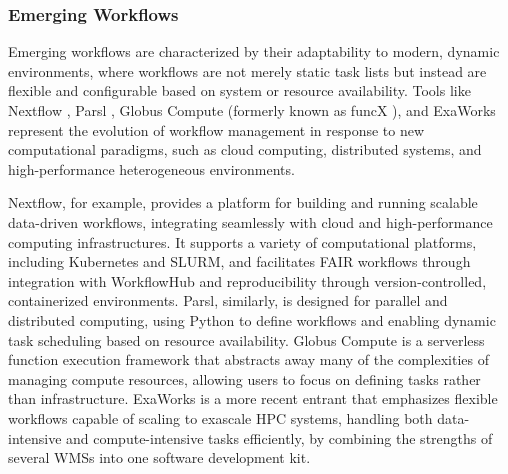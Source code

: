 
\subsubsection{Emerging Workflows}

Emerging workflows are characterized by their adaptability to modern, dynamic environments, where workflows are not merely static task lists but instead are flexible and configurable based on system or resource availability. Tools like Nextflow \citep{di_tommaso_nextflow_2017}, Parsl 
 \citep{babuji2019}, Globus Compute (formerly known as funcX \citep{chard2020}), and ExaWorks \citep{alsaadi2024} represent the evolution of workflow management in response to new computational paradigms, such as cloud computing, distributed systems, and high-performance heterogeneous environments.

Nextflow, for example, provides a platform for building and running scalable data-driven workflows, integrating seamlessly with cloud and high-performance computing infrastructures. It supports a variety of computational platforms, including Kubernetes and SLURM, and facilitates FAIR workflows \citep{wilkinson2025, wilkinson2022} through integration with WorkflowHub \citep{gustafsson2024} and reproducibility through version-controlled, containerized environments. Parsl, similarly, is designed for parallel and distributed computing, using Python to define workflows and enabling dynamic task scheduling based on resource availability. Globus Compute is a serverless function execution framework that abstracts away many of the complexities of managing compute resources, allowing users to focus on defining tasks rather than infrastructure. ExaWorks is a more recent entrant that emphasizes flexible workflows capable of scaling to exascale HPC systems, handling both data-intensive and compute-intensive tasks efficiently, by combining the strengths of several WMSs into one software development kit.

